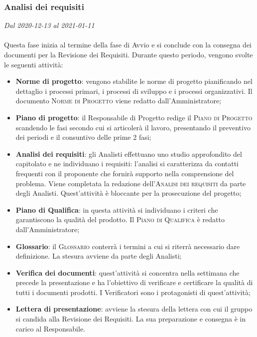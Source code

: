 \subsubsection{Analisi dei requisiti}

\textit{Dal 2020-12-13 al 2021-01-11}
\\\\
Questa fase inizia al termine della fase di Avvio e si conclude con la consegna dei documenti per la Revisione dei Requisiti.
Durante questo periodo, vengono svolte le seguenti attività:
\begin{itemize}
	\item \textbf{Norme di progetto}: vengono stabilite le norme di progetto pianificando nel dettaglio i processi primari, i processi di sviluppo e i processi organizzativi. Il documento \textsc{Norme di Progetto} viene redatto dall'Amministratore;
	\item \textbf{Piano di progetto}: il Responsabile di Progetto redige il \textsc{Piano di Progetto} scandendo le fasi secondo cui si articolerà il lavoro, presentando il preventivo dei periodi e il consuntivo delle prime 2 fasi;
	\item \textbf{Analisi dei requisiti}: gli Analisti effettuano uno studio approfondito del capitolato e ne individuano i requisiti: l'analisi si caratterizza da contatti frequenti con il proponente che fornirà supporto nella comprensione del problema. Viene completata la redazione dell'\textsc{Analisi dei requisiti} da parte degli Analisti. Quest'attività è bloccante per la prosecuzione del progetto;
	\item \textbf{Piano di Qualifica}: in questa attività si individuano i criteri che garantiscono la qualità del prodotto. Il \textsc{Piano di Qualifica} è redatto dall'Amministratore;
	\item \textbf{Glossario}: il \textsc{Glossario} conterrà i termini a cui si riterrà necessario dare definizione. La stesura avviene da parte degli Analisti;
	\item \textbf{Verifica dei documenti}: quest'attività si concentra nella settimana che precede la presentazione e ha l'obiettivo di verificare e certificare la qualità di tutti i documenti prodotti. I Verificatori sono i protagonisti di quest'attività;
	\item \textbf{Lettera di presentazione}: avviene la stesura della lettera con cui il gruppo si candida alla Revisione dei Requisiti. La sua preparazione e consegna è in carico al Responsabile.
\end{itemize}

